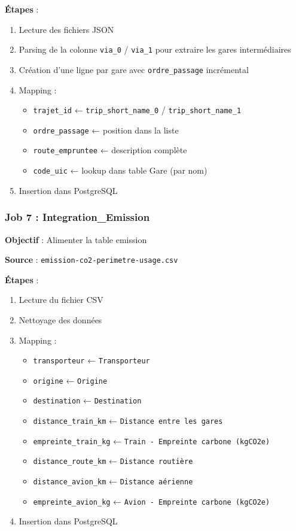 \documentclass[12pt,a4paper]{article}
\begin{document}
\textbf{Étapes} :
\begin{enumerate}
    \item Lecture des fichiers JSON
    \item Parsing de la colonne \texttt{via\_0} / \texttt{via\_1} pour extraire les gares intermédiaires
    \item Création d'une ligne par gare avec \texttt{ordre\_passage} incrémental
    \item Mapping :
        \begin{itemize}
            \item \texttt{trajet\_id} ← \texttt{trip\_short\_name\_0} / \texttt{trip\_short\_name\_1}
            \item \texttt{ordre\_passage} ← position dans la liste
            \item \texttt{route\_empruntee} ← description complète
            \item \texttt{code\_uic} ← lookup dans table Gare (par nom)
        \end{itemize}
    \item Insertion dans PostgreSQL
\end{enumerate}

\subsubsection{Job 7 : Integration\_Emission}

\textbf{Objectif} : Alimenter la table emission

\textbf{Source} : \texttt{emission-co2-perimetre-usage.csv}

\textbf{Étapes} :
\begin{enumerate}
    \item Lecture du fichier CSV
    \item Nettoyage des données
    \item Mapping :
        \begin{itemize}
            \item \texttt{transporteur} ← \texttt{Transporteur}
            \item \texttt{origine} ← \texttt{Origine}
            \item \texttt{destination} ← \texttt{Destination}
            \item \texttt{distance\_train\_km} ← \texttt{Distance entre les gares}
            \item \texttt{empreinte\_train\_kg} ← \texttt{Train - Empreinte carbone (kgCO2e)}
            \item \texttt{distance\_route\_km} ← \texttt{Distance routière}
            \item \texttt{distance\_avion\_km} ← \texttt{Distance aérienne}
            \item \texttt{empreinte\_avion\_kg} ← \texttt{Avion - Empreinte carbone (kgCO2e)}
        \end{itemize}
    \item Insertion dans PostgreSQL
\end{enumerate}
\end{document}
